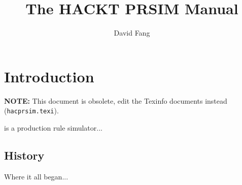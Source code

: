 \documentclass[12pt]{article}
\begin{document}
\title{The HACKT PRSIM Manual}
\author{David Fang}

\maketitle



\section{Introduction}
\label{sec:intro}

\textbf{NOTE:} This document is obsolete, edit the Texinfo documents
instead (\texttt{hacprsim.texi}).

 is a production rule simulator...

\subsection{History}
\label{sec:intro:history}

Where it all began...

% 
% 
% 
% 
% 
% 
% 
% 
% 
% 
% 
% 
% 

% 

\end{document}
